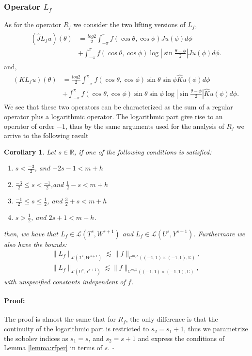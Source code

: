 \documentclass{article}
\newtheorem{corollary}[theorem]{Corollary}
\newenvironment{proof}{\paragraph{Proof:}}{\hfill$\square$}
\newcommand{\IC}{{\mathbb C}}
\newcommand{\IR}{{\mathbb R}}
\newcommand{\cmspaceh}[4]{\mathcal{C}^{#1,#2} \left( #3, #4 \right)}
\newcommand{\iinterv}{(-1,1)\times(-1,1)}
\begin{document}
\subsubsection{Operator $L_f$}

As for the operator $R_f$ we consider the two lifting versions of $L_f$, 
\begin{align}
\label{eq:Lsplit}
\begin{split}
(\widehat{J}L_fu)(\theta) &= \frac{log{2}}{2} \int_{-\pi}^{\pi} f(\cos \theta , \cos \phi) Ju(\phi) d\phi \\&+ \int_{-\pi}^{\pi} f(\cos \theta, \cos \phi) \log \left\vert \sin \frac{\theta-\phi}{2} \right\vert Ju(\phi) d\phi.
\end{split}
\end{align}
and, 
\begin{align}
\label{eq:Lsplitodd}
\begin{split}
(KL_fu)(\theta) &= \frac{log{2}}{2} \int_{-\pi}^{\pi} f(\cos \theta , \cos \phi)\sin \theta \sin \phi \widehat{K}u(\phi) d\phi \\&+ \int_{-\pi}^{\pi} f(\cos \theta, \cos \phi)\sin \theta \sin \phi \log \left\vert \sin \frac{\theta-\phi}{2} \right\vert \widehat{K}u(\phi) d\phi.
\end{split}
\end{align}
We see that these two operators can be characterized as the sum of a regular operator plus a logarithmic operator. The logarithmic part give rise to an operator of order $-1$, thus by the same arguments used for the analysis of $R_f$ we arrive to the following result  

\begin{corollary}
\label{corollary:lfop}
Let $s \in \IR$, if one of the following conditions is satisfied: 
\begin{enumerate}
\item $s< \frac{-3}{2}$, and $-2s-1 < m+h$
\item 
$\frac{-3}{2} \leq s < \frac{-1}{2}$,and  $ \frac{1}{2}-s < m+h$
\item 
$\frac{-1}{2} \leq s \leq \frac{1}{2}$, and $\frac{3}{2}+s < m+h$
\item 
$s > \frac{1}{2}$, and $2s + 1 < m+h$.
\end{enumerate}
then, we have that $ L_f  \in \mathcal{L}(T^{s},W^{s+1})$ and  $L_f  \in \mathcal{L}(U^{s},Y^{s+1})$. Furthermore we also have the bounds: 
\begin{align*}
\| L_f\|_{ \mathcal{L}(T^{s},W^{s+1})} \lesssim \|f\|_{\cmspaceh{m}{h}{\iinterv}{\IC}},\\
\| L_f\|_{ \mathcal{L}(U^{s},Y^{s+1})} \lesssim \|f\|_{\cmspaceh{m}{h}{\iinterv}{\IC}},
\end{align*}
with unspecified constants independent of $f$.
\end{corollary}
\begin{proof}
The proof is almost the same that for $R_f$, the only difference is that the continuity of the logarithmic part is restricted to $s_2 = s_1+1$, thus we parametrize the sobolev indices as $s_1 = s$, and $s_2 = s+1$ and express the conditions of Lemma \ref{lemma:rfper} in terms of $s$. 
\end{proof}
\end{document}
